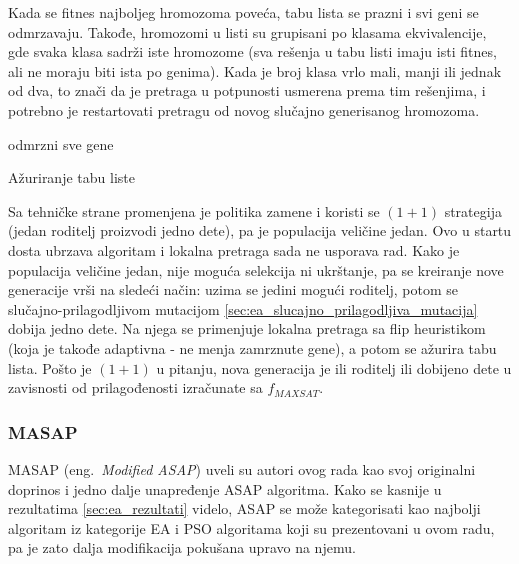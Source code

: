 \documentclass[a4paper]{article}
\begin{document}
Kada se fitnes najboljeg hromozoma poveća, tabu lista se prazni i svi geni se odmrzavaju.
Takođe, hromozomi u listi su grupisani po klasama ekvivalencije, gde svaka klasa sadrži
iste hromozome (sva rešenja u tabu listi imaju isti fitnes, 
ali ne moraju biti ista po genima). Kada je broj klasa vrlo mali, manji ili jednak od dva,
to znači da je pretraga u potpunosti usmerena prema tim rešenjima, i potrebno je restartovati
pretragu od novog slučajno generisanog hromozoma. \\

\begin{algorithm}[H]
\SetAlgoLined
{}

\BlankLine
 odmrzni sve gene\;
 \caption{Ažuriranje tabu liste}
\end{algorithm}

Sa tehničke strane promenjena je politika zamene i koristi se $(1+1)$ strategija 
(jedan roditelj proizvodi jedno dete), pa je populacija veličine jedan. Ovo u startu dosta
ubrzava algoritam i lokalna pretraga sada ne usporava rad.
Kako je populacija veličine jedan, nije moguća selekcija ni ukrštanje, 
pa se kreiranje nove generacije vrši na sledeći način: 
uzima se jedini mogući roditelj, potom se slučajno-prilagodljivom mutacijom
\ref{sec:ea_slucajno_prilagodljiva_mutacija} dobija jedno dete. 
Na njega se primenjuje lokalna pretraga sa flip heuristikom (koja je takođe adaptivna - 
ne menja zamrznute gene), a potom se ažurira tabu lista.
Pošto je $(1+1)$ u pitanju, nova generacija je ili roditelj ili dobijeno dete 
u zavisnosti od prilagođenosti izračunate sa $f_{MAXSAT}$.


\subsubsection{MASAP}
\label{sec:ea_masap}
MASAP (eng.~{\em Modified ASAP}) uveli su autori ovog rada kao svoj originalni doprinos 
i jedno dalje unapređenje ASAP algoritma. Kako se kasnije u rezultatima
\ref{sec:ea_rezultati} videlo, ASAP se može kategorisati kao najbolji 
algoritam iz kategorije EA i PSO algoritama koji su prezentovani u ovom radu, 
pa je zato dalja modifikacija pokušana upravo na njemu. \\
\end{document}
